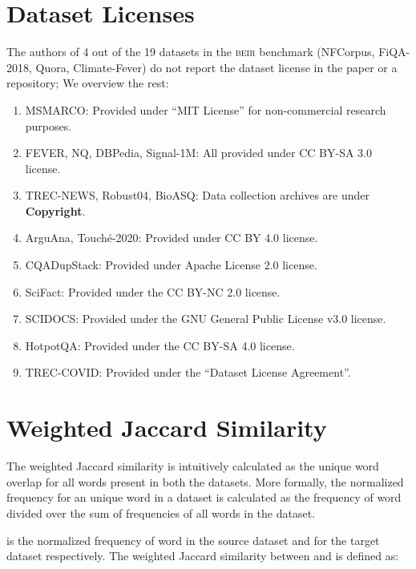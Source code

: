 \documentclass{article}
\newcommand{\custo}[1]{\textsc{\normalsize #1}}
\newcommand{\beir}{\custo{beir}\xspace}
\begin{document}
\vspace{-2mm}
\section{Dataset Licenses}\label{sec:dataset_licenses}
\vspace{-2mm}

The authors of 4 out of the 19 datasets in the \beir benchmark (NFCorpus, FiQA-2018, Quora, Climate-Fever) do not report the dataset license in the paper or a repository; We overview the rest:

\begin{enumerate}
    \item[] MSMARCO: Provided under ``MIT License'' for non-commercial research purposes.
    \item[] FEVER, NQ, DBPedia, Signal-1M: All provided under CC BY-SA 3.0 license.
    \item[] TREC-NEWS, Robust04, BioASQ: Data collection archives are under \textbf{Copyright}.
    \item[] ArguAna, Touch\'e-2020: Provided under CC BY 4.0 license.
    \item[] CQADupStack: Provided under Apache License 2.0 license.
    \item[] SciFact: Provided under the CC BY-NC 2.0 license.
    \item[] SCIDOCS: Provided under the GNU General Public License v3.0 license.
    \item[] HotpotQA: Provided under the CC BY-SA 4.0 license.
    \item[] TREC-COVID: Provided under the ``Dataset License Agreement''.
    
\end{enumerate}


\section{Weighted Jaccard Similarity}\label{sec:weighted_jaccard_similarity}
\vspace{-2mm}

The weighted Jaccard similarity  \cite{ioffe2010improved} is intuitively calculated as the unique word overlap for all words present in both the datasets. More formally, the normalized frequency for an unique word  in a dataset is calculated as the frequency of word  divided over the sum of frequencies of all words in the dataset. 

 is the normalized frequency of word  in the source dataset  and  for the target dataset  respectively. The weighted Jaccard similarity between  and  is defined as:
\end{document}

